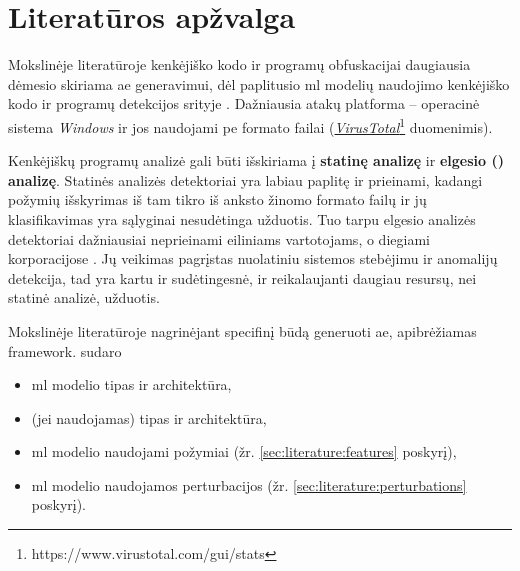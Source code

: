 \section{Literatūros apžvalga}\label{sec:literature}

Mokslinėje literatūroje kenkėjiško kodo ir programų obfuskacijai daugiausia dėmesio skiriama \ac{ae} generavimui, dėl paplitusio \acs{ml} modelių naudojimo kenkėjiško kodo ir programų detekcijos srityje \cite{andersonLearningEvadeStatic2018}. Dažniausia atakų platforma -- operacinė sistema \textit{Windows} ir jos naudojami \acs{pe} formato failai (\href{https://www.virustotal.com/gui/stats}{\textit{VirusTotal}}\footnote{https://www.virustotal.com/gui/stats} duomenimis).

Kenkėjiškų programų analizė gali būti išskiriama į \textbf{statinę analizę} ir \textbf{elgesio () analizę}. Statinės analizės detektoriai yra labiau paplitę ir prieinami, kadangi požymių išskyrimas iš tam tikro iš anksto žinomo formato failų ir jų klasifikavimas yra sąlyginai nesudėtinga užduotis. Tuo tarpu elgesio analizės detektoriai dažniausiai neprieinami eiliniams vartotojams, o diegiami korporacijose \cite{rosenbergGenericBlackBoxEndEnd2018}. Jų veikimas pagrįstas nuolatiniu sistemos stebėjimu ir anomalijų detekcija, tad yra kartu ir sudėtingesnė, ir reikalaujanti daugiau resursų, nei statinė analizė, užduotis.

Mokslinėje literatūroje nagrinėjant specifinį būdą generuoti \acs{ae}, apibrėžiamas \gls{framework}.  sudaro
\begin{itemize}
    \item \acs{ml} modelio tipas ir architektūra,
    \item {} (jei naudojamas) tipas ir architektūra,
    \item \acs{ml} modelio naudojami požymiai (žr. \ref{sec:literature:features} poskyrį),
    \item \acs{ml} modelio naudojamos perturbacijos (žr. \ref{sec:literature:perturbations} poskyrį).
\end{itemize}







